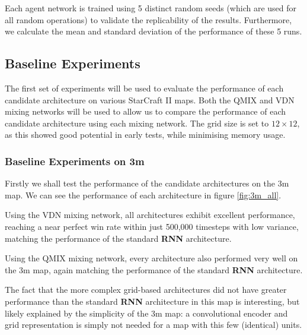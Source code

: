 Each agent network is trained using 5 distinct random seeds (which are used for all random operations) to validate the replicability of the results. Furthermore, we calculate the mean and standard deviation of the performance of these 5 runs.

\subsection{Baseline Experiments}

The first set of experiments will be used to evaluate the performance of each candidate architecture on various StarCraft II maps. Both the QMIX and VDN mixing networks will be used to allow us to compare the performance of each candidate architecture using each mixing network. The grid size is set to $12\times12$, as this showed good potential in early tests, while minimising memory usage.


\subsubsection{Baseline Experiments on 3m}

Firstly we shall test the performance of the candidate architectures on the 3m map. We can see the performance of each architecture in figure \ref{fig:3m_all}. 

Using the VDN mixing network, all architectures exhibit excellent performance, reaching a near perfect win rate within just 500,000 timesteps with low variance, matching the performance of the standard \textbf{RNN} architecture.

Using the QMIX mixing network, every architecture also performed very well on the 3m map, again matching the performance of the standard \textbf{RNN} architecture. 

The fact that the more complex grid-based architectures did not have greater performance than the standard \textbf{RNN} architecture in this map is interesting, but likely explained by the simplicity of the 3m map: a convolutional encoder and grid representation is simply not needed for a map with this few (identical) units.

